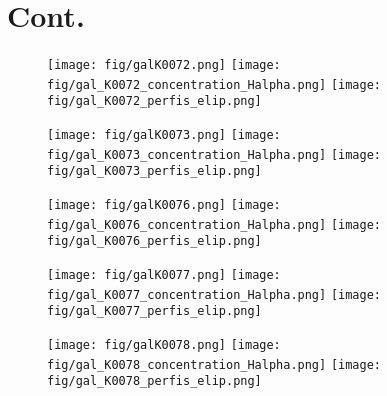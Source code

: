 \chapter{Cont.}
\label{cap02}



\begin{figure}[!ht]
\begin{center}
\setcaptionmargin{1cm}
\texttt{[image: fig/galK0072.png]}
\texttt{[image: fig/gal\_K0072\_concentration\_Halpha.png]}
\texttt{[image: fig/gal\_K0072\_perfis\_elip.png]}
\end{center}
\end{figure}


\begin{figure}[!ht]
\begin{center}
\setcaptionmargin{1cm}
\texttt{[image: fig/galK0073.png]}
\texttt{[image: fig/gal\_K0073\_concentration\_Halpha.png]}
\texttt{[image: fig/gal\_K0073\_perfis\_elip.png]}
\end{center}
\end{figure}


\begin{figure}[!ht]
\begin{center}
\setcaptionmargin{1cm}
\texttt{[image: fig/galK0076.png]}
\texttt{[image: fig/gal\_K0076\_concentration\_Halpha.png]}
\texttt{[image: fig/gal\_K0076\_perfis\_elip.png]}
\end{center}
\end{figure}


\begin{figure}[!ht]
\begin{center}
\setcaptionmargin{1cm}
\texttt{[image: fig/galK0077.png]}
\texttt{[image: fig/gal\_K0077\_concentration\_Halpha.png]}
\texttt{[image: fig/gal\_K0077\_perfis\_elip.png]}
\end{center}
\end{figure}


\begin{figure}[!ht]
\begin{center}
\setcaptionmargin{1cm}
\texttt{[image: fig/galK0078.png]}
\texttt{[image: fig/gal\_K0078\_concentration\_Halpha.png]}
\texttt{[image: fig/gal\_K0078\_perfis\_elip.png]}
\end{center}
\end{figure}


